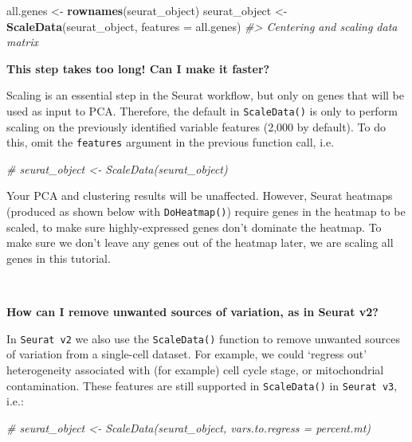 \documentclass[
]{book}
\newenvironment{Shaded}{\begin{snugshade}}{\end{snugshade}}
\newcommand{\AttributeTok}[1]{\textcolor[rgb]{0.13,0.29,0.53}{#1}}
\newcommand{\CommentTok}[1]{\textcolor[rgb]{0.56,0.35,0.01}{\textit{#1}}}
\newcommand{\FunctionTok}[1]{\textcolor[rgb]{0.13,0.29,0.53}{\textbf{#1}}}
\newcommand{\NormalTok}[1]{#1}
\newcommand{\OtherTok}[1]{\textcolor[rgb]{0.56,0.35,0.01}{#1}}
\begin{document}
\begin{Shaded}
\begin{Highlighting}[]
\NormalTok{all.genes }\OtherTok{\textless{}{-}} \FunctionTok{rownames}\NormalTok{(seurat\_object)}
\NormalTok{seurat\_object }\OtherTok{\textless{}{-}} \FunctionTok{ScaleData}\NormalTok{(seurat\_object, }\AttributeTok{features =}\NormalTok{ all.genes)}
\CommentTok{\#\textgreater{} Centering and scaling data matrix}
\end{Highlighting}
\end{Shaded}

\textbf{This step takes too long! Can I make it faster?}

Scaling is an essential step in the Seurat workflow, but only on genes that will be used as input to PCA. Therefore, the default in \texttt{ScaleData()} is only to perform scaling on the previously identified variable features (2,000 by default). To do this, omit the \texttt{features} argument in the previous function call, i.e.

\begin{Shaded}
\begin{Highlighting}[]
\CommentTok{\# seurat\_object \textless{}{-} ScaleData(seurat\_object)}
\end{Highlighting}
\end{Shaded}

Your PCA and clustering results will be unaffected. However, Seurat heatmaps (produced as shown below with \texttt{DoHeatmap()}) require genes in the heatmap to be scaled, to make sure highly-expressed genes don't dominate the heatmap. To make sure we don't leave any genes out of the heatmap later, we are scaling all genes in this tutorial.

~

\textbf{How can I remove unwanted sources of variation, as in Seurat v2?}

In \texttt{Seurat\ v2} we also use the \texttt{ScaleData()} function to remove unwanted sources of variation from a single-cell dataset. For example, we could `regress out' heterogeneity associated with (for example) cell cycle stage, or mitochondrial contamination. These features are still supported in \texttt{ScaleData()} in \texttt{Seurat\ v3}, i.e.:

\begin{Shaded}
\begin{Highlighting}[]
\CommentTok{\# seurat\_object \textless{}{-} ScaleData(seurat\_object, vars.to.regress = \textquotesingle{}percent.mt\textquotesingle{})}
\end{Highlighting}
\end{Shaded}
\end{document}
